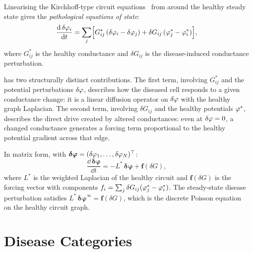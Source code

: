 Linearising the Kirchhoff-type circuit equations~\citep{Kirchhoff1847} from 
around the healthy steady state gives the \emph{pathological equations of
state}:
\begin{equation}
  \frac{\dd\,\delta\varphi_i}{\dd t}
  = \sum_{j} \Bigl[
      G_{ij}^{*}\,(\delta\varphi_i - \delta\varphi_j)
      + \delta G_{ij}\,(\varphi_j^{*} - \varphi_i^{*})
    \Bigr],
  \label{eq:pathological-eqs}
\end{equation}
where $G_{ij}^{*}$ is the healthy conductance and $\delta G_{ij}$ is the
disease-induced conductance perturbation.

\begin{remark}
 has two structurally distinct contributions.
The first term, involving $G_{ij}^{*}$ and the potential perturbations
$\delta\varphi$, describes how the diseased cell responds to a given
conductance change: it is a linear diffusion operator on $\delta\varphi$
with the healthy graph Laplacian.  The second term, involving $\delta G_{ij}$
and the healthy potentials $\varphi^{*}$, describes the direct drive
created by altered conductances: even at $\delta\varphi = 0$, a
changed conductance generates a forcing term proportional to the healthy
potential gradient across that edge.
\end{remark}

In matrix form, with $\boldsymbol{\delta\varphi} = (\delta\varphi_1,\ldots,\delta\varphi_N)^\top$:
\begin{equation}
  \frac{\dd\,\boldsymbol{\delta\varphi}}{\dd t}
  = -L^{*}\,\boldsymbol{\delta\varphi} + \mathbf{f}(\delta G),
  \label{eq:matrix-pathological}
\end{equation}
where $L^{*}$ is the weighted Laplacian of the healthy circuit and
$\mathbf{f}(\delta G)$ is the forcing vector with components
$f_i = \sum_j \delta G_{ij}(\varphi_j^{*} - \varphi_i^{*})$.
The steady-state disease perturbation satisfies
$L^{*}\,\boldsymbol{\delta\varphi}^{\infty} = \mathbf{f}(\delta G)$,
which is the discrete Poisson equation on the healthy circuit graph.

\section{Disease Categories}
\label{sec:disease-categories}

